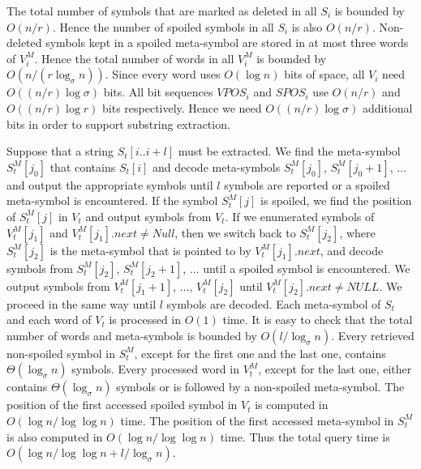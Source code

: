 \documentclass[11pt]{article}\usepackage{fullpage}
\begin{document}
The total number of symbols that are marked as deleted in all $S_i$ is bounded by $O(n/r)$. Hence the number of spoiled symbols in all $S_i$ is also $O(n/r)$. 
Non-deleted symbols kept in a spoiled meta-symbol are stored in at most three words of $V_i^M$. Hence the total number of words in all $V_i^M$ is bounded by $O(n/(r\log_{\sigma}n))$. Since every word uses $O(\log n)$ bits of space, all $V_i$ need $O((n/r)\log \sigma)$  bits.  All bit sequences $VPOS_i$ and $SPOS_i$ use $O(n/r)$ and $O((n/r)\log r)$ bits respectively. Hence we need 
$O((n/r)\log\sigma)$ additional bits in order to support substring extraction.

 


Suppose that a string $S_t[i..i+l]$ must be extracted. We find the meta-symbol $S^M_t[j_0]$ that contains $S_t[i]$ and decode meta-symbols $S^M_t[j_0]$, $S^M_t[j_0+1]$, $\ldots$ and output the appropriate symbols until $l$ symbols are reported or a spoiled meta-symbol is encountered. If the symbol $S^M_t[j]$ 
is spoiled, we find the position of $S^M_t[j]$ in $V_t$ and output  symbols from $V_t$. If we enumerated symbols of $V^M_t[j_1]$ and $V^M_t[j_1].next\not=Null$, then we switch back to $S^M_t[j_2]$, where $S^M_t[j_2]$ is the meta-symbol that is pointed to by $V^M_t[j_1].next$, and decode symbols from $S^M_t[j_2]$, $S^M_t[j_2+1]$, $\ldots$ until a spoiled symbol is encountered. We output symbols from $V_t^M[j_1+1]$, $\ldots$, $V^M_t[j_2]$ until $V_t^M[j_2].next\not=NULL$.  
We proceed in the same way until $l$ symbols are decoded. 
Each meta-symbol of $S_t$ and each word of $V_t$ is processed in $O(1)$ time. It is easy to check that the total number of words and meta-symbols  is bounded by $O(l/\log_{\sigma} n)$. Every retrieved non-spoiled symbol in $S_t^M$, except for the first one and the last one, contains $\Theta(\log_{\sigma}n)$ symbols. Every processed word in $V^M_t$, except for the last one, either contains $\Theta(\log_{\sigma}n)$ symbols or is followed by a non-spoiled meta-symbol.  The position of the first accessed spoiled symbol in $V_t$ is computed in $O(\log n/\log\log n)$ time. The position of the first accessed meta-symbol in $S_t^M$ is also computed in $O(\log n/\log\log n)$ time.  Thus the total query time is $O(\log n/\log \log n +l/\log_{\sigma}n)$. 
\end{document}
